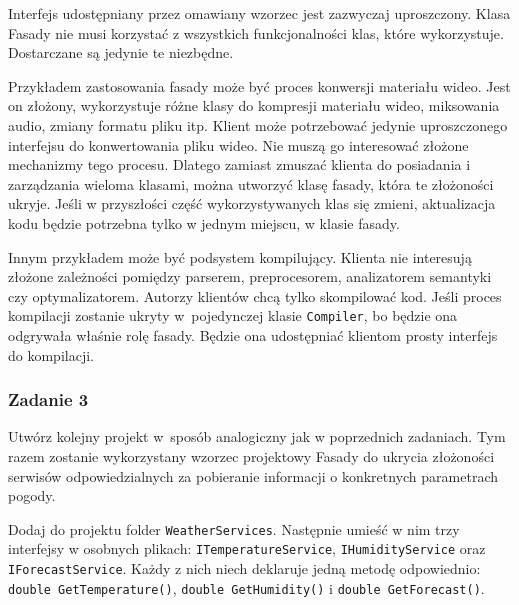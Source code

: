 Interfejs udostępniany przez omawiany wzorzec jest zazwyczaj uproszczony. Klasa Fasady nie musi korzystać z wszystkich funkcjonalności klas, które wykorzystuje. Dostarczane są jedynie te niezbędne. 

Przykładem zastosowania fasady może być proces konwersji materiału wideo. Jest on złożony, wykorzystuje różne klasy do kompresji materiału wideo, miksowania audio, zmiany formatu pliku itp. Klient może potrzebować jedynie uproszczonego interfejsu do konwertowania pliku wideo. Nie muszą go interesować złożone mechanizmy tego procesu. Dlatego zamiast zmuszać klienta do posiadania i zarządzania wieloma klasami, można utworzyć klasę fasady, która te złożoności ukryje. Jeśli w przyszłości część wykorzystywanych klas się zmieni, aktualizacja kodu będzie potrzebna tylko w jednym miejscu, w klasie fasady.

Innym przykładem może być podsystem kompilujący. Klienta nie interesują złożone zależności pomiędzy parserem, preprocesorem, analizatorem semantyki czy optymalizatorem. Autorzy klientów chcą tylko skompilować kod. Jeśli proces kompilacji zostanie ukryty w~pojedynczej klasie \texttt{Compiler}, bo będzie ona odgrywała właśnie rolę fasady. Będzie ona udostępniać klientom prosty interfejs do kompilacji.

\subsubsection{Zadanie 3}

Utwórz kolejny projekt w~sposób analogiczny jak w poprzednich zadaniach. Tym razem zostanie wykorzystany wzorzec projektowy Fasady do ukrycia złożoności serwisów odpowiedzialnych za pobieranie informacji o konkretnych parametrach pogody.

Dodaj do projektu folder \texttt{WeatherServices}. Następnie umieść w nim trzy interfejsy w osobnych plikach: \texttt{ITemperatureService}, \texttt{IHumidityService} oraz \texttt{IForecastService}. Każdy z nich niech deklaruje jedną metodę odpowiednio: \texttt{double GetTemperature()}, \texttt{double GetHumidity()} i \texttt{double GetForecast()}. 

